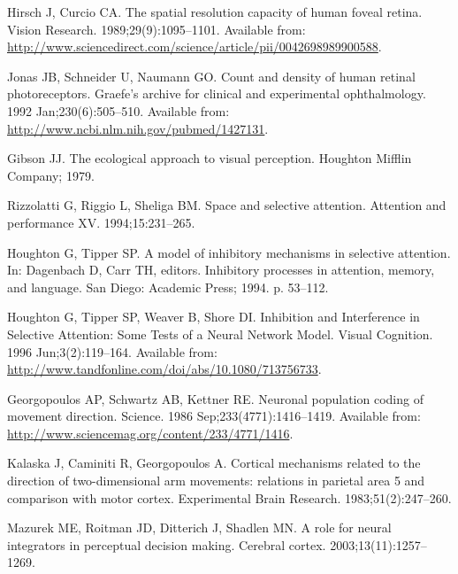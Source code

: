 \documentclass[10pt,letterpaper]{article}
\begin{document}
\begin{thebibliography}{10}
Hirsch J, Curcio CA.
\newblock The spatial resolution capacity of human foveal retina.
\newblock Vision Research. 1989;29(9):1095--1101.
\newblock Available from:
  \url{http://www.sciencedirect.com/science/article/pii/0042698989900588}.

Jonas JB, Schneider U, Naumann GO.
\newblock Count and density of human retinal photoreceptors.
\newblock Graefe's archive for clinical and experimental ophthalmology. 1992
  Jan;230(6):505--510.
\newblock Available from: \url{http://www.ncbi.nlm.nih.gov/pubmed/1427131}.

Gibson JJ.
\newblock The ecological approach to visual perception.
\newblock Houghton Mifflin Company; 1979.

Rizzolatti G, Riggio L, Sheliga BM.
\newblock Space and selective attention.
\newblock Attention and performance XV. 1994;15:231--265.

Houghton G, Tipper SP.
\newblock A model of inhibitory mechanisms in selective attention.
\newblock In: Dagenbach D, Carr TH, editors. Inhibitory processes in attention,
  memory, and language. San Diego: Academic Press; 1994. p. 53--112.

Houghton G, Tipper SP, Weaver B, Shore DI.
\newblock Inhibition and {Interference} in {Selective} {Attention}: {Some}
  {Tests} of a {Neural} {Network} {Model}.
\newblock Visual Cognition. 1996 Jun;3(2):119--164.
\newblock Available from:
  \url{http://www.tandfonline.com/doi/abs/10.1080/713756733}.

Georgopoulos AP, Schwartz AB, Kettner RE.
\newblock Neuronal population coding of movement direction.
\newblock Science. 1986 Sep;233(4771):1416--1419.
\newblock Available from:
  \url{http://www.sciencemag.org/content/233/4771/1416}.

Kalaska J, Caminiti R, Georgopoulos A.
\newblock Cortical mechanisms related to the direction of two-dimensional arm
  movements: relations in parietal area 5 and comparison with motor cortex.
\newblock Experimental Brain Research. 1983;51(2):247--260.

Mazurek ME, Roitman JD, Ditterich J, Shadlen MN.
\newblock A role for neural integrators in perceptual decision making.
\newblock Cerebral cortex. 2003;13(11):1257--1269.


\end{thebibliography}
\end{document}
